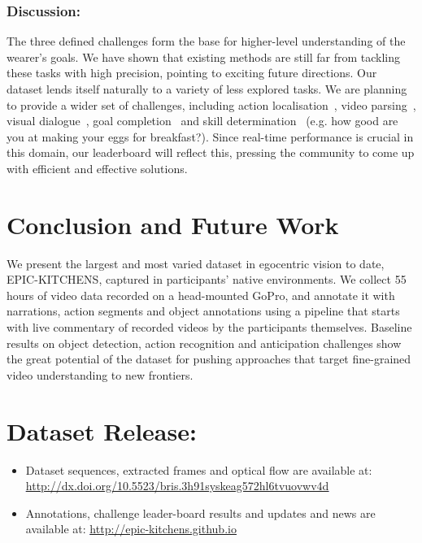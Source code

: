 \documentclass[runningheads]{llncs}
\newcommand{\EPIC}{\textcolor{EPIC-COLOR}{{EPIC-KITCHENS}}}
\begin{document}
\subsubsection{Discussion:} The three defined challenges form the base for higher-level understanding of the wearer's goals. We have shown that existing methods are still far from tackling these tasks with high precision, pointing to exciting future directions. Our dataset lends itself naturally to a variety of less explored tasks. We are planning to provide a wider set of challenges, including action localisation~\cite{Yeung2018}, video parsing~\cite{Sigurdsson2016}, visual dialogue~\cite{visdial}, goal completion~\cite{Heidarivincheh2018} and skill determination~\cite{Hazel2018} (e.g. how good are you at making your eggs for breakfast?). Since real-time performance is crucial in this domain, our leaderboard will reflect this, pressing the community to come up with efficient and effective solutions.

\section{Conclusion and Future Work}
We present the largest and most varied dataset in egocentric vision to date, \EPIC{}, captured in participants' native environments. We collect 55 hours of video data recorded on a head-mounted GoPro, and annotate it with narrations, action segments and object annotations using a pipeline that starts with live commentary of recorded videos by the participants themselves. 
Baseline results on object detection, action recognition and anticipation challenges show the great potential of the dataset for pushing approaches that target fine-grained video understanding to new frontiers.


\section*{Dataset Release:}

\begin{itemize}[leftmargin=*]
\item Dataset sequences, extracted frames and optical flow are available at: \\\textcolor{blue}{\underline{\url{http://dx.doi.org/10.5523/bris.3h91syskeag572hl6tvuovwv4d}}}

\item Annotations, challenge leader-board results and updates and news are available at: \textcolor{blue}{\underline{\url{http://epic-kitchens.github.io}}}
\end{itemize}
\end{document}
